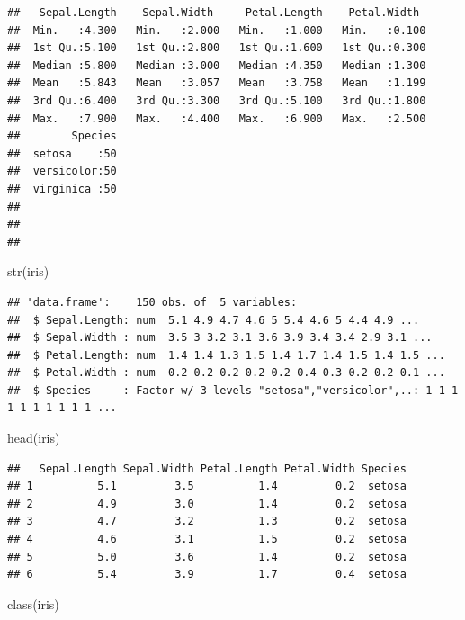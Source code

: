 \documentclass[
]{book}
\newenvironment{Shaded}{\begin{snugshade}}{\end{snugshade}}
\newcommand{\FunctionTok}[1]{\textcolor[rgb]{0.00,0.00,0.00}{#1}}
\newcommand{\NormalTok}[1]{#1}
\begin{document}
\begin{verbatim}
##   Sepal.Length    Sepal.Width     Petal.Length    Petal.Width   
##  Min.   :4.300   Min.   :2.000   Min.   :1.000   Min.   :0.100  
##  1st Qu.:5.100   1st Qu.:2.800   1st Qu.:1.600   1st Qu.:0.300  
##  Median :5.800   Median :3.000   Median :4.350   Median :1.300  
##  Mean   :5.843   Mean   :3.057   Mean   :3.758   Mean   :1.199  
##  3rd Qu.:6.400   3rd Qu.:3.300   3rd Qu.:5.100   3rd Qu.:1.800  
##  Max.   :7.900   Max.   :4.400   Max.   :6.900   Max.   :2.500  
##        Species  
##  setosa    :50  
##  versicolor:50  
##  virginica :50  
##                 
##                 
## 
\end{verbatim}

\begin{Shaded}
\begin{Highlighting}[]
\FunctionTok{str}\NormalTok{(iris)}
\end{Highlighting}
\end{Shaded}

\begin{verbatim}
## 'data.frame':    150 obs. of  5 variables:
##  $ Sepal.Length: num  5.1 4.9 4.7 4.6 5 5.4 4.6 5 4.4 4.9 ...
##  $ Sepal.Width : num  3.5 3 3.2 3.1 3.6 3.9 3.4 3.4 2.9 3.1 ...
##  $ Petal.Length: num  1.4 1.4 1.3 1.5 1.4 1.7 1.4 1.5 1.4 1.5 ...
##  $ Petal.Width : num  0.2 0.2 0.2 0.2 0.2 0.4 0.3 0.2 0.2 0.1 ...
##  $ Species     : Factor w/ 3 levels "setosa","versicolor",..: 1 1 1 1 1 1 1 1 1 1 ...
\end{verbatim}

\begin{Shaded}
\begin{Highlighting}[]
\FunctionTok{head}\NormalTok{(iris)}
\end{Highlighting}
\end{Shaded}

\begin{verbatim}
##   Sepal.Length Sepal.Width Petal.Length Petal.Width Species
## 1          5.1         3.5          1.4         0.2  setosa
## 2          4.9         3.0          1.4         0.2  setosa
## 3          4.7         3.2          1.3         0.2  setosa
## 4          4.6         3.1          1.5         0.2  setosa
## 5          5.0         3.6          1.4         0.2  setosa
## 6          5.4         3.9          1.7         0.4  setosa
\end{verbatim}

\begin{Shaded}
\begin{Highlighting}[]
\FunctionTok{class}\NormalTok{(iris)}
\end{Highlighting}
\end{Shaded}
\end{document}
